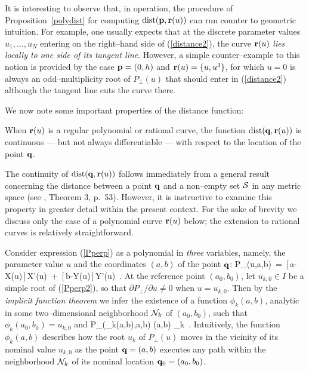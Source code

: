 \begin{exmpl}
{\rm
It is interesting to observe that, in operation, the procedure of
Proposition~\ref{polydist} for computing ${\rm dist}({\bf p},{\bf r}(u))$
can run counter to geometric intuition. For example, one usually
expects that at the discrete parameter values $u_1,\dots,u_N$
entering on the right--hand side of (\ref{distance2}), the curve
${\bf r}(u)$ {\it lies locally to one side of its tangent line}.
However, a simple counter--example to this notion is provided by
the case ${\bf p}=(0,h)$ and ${\bf r}(u)=\{u,u^3\}$, for which
$u=0$ is always an odd--multiplicity root of $P_\perp(u)$ that
should enter in (\ref{distance2}) although the tangent line cuts
the curve there.
} \QED
\end{exmpl}

We now note some important properties of the distance function:

\begin{propn}
When ${\bf r}(u)$ is a regular polynomial or rational curve, the
function ${\rm dist}({\bf q},{\bf r}(u))$ is continuous --- but not
always differentiable --- with respect to the location of the point
${\bf q}$.
\end{propn}

\prf The continuity of ${\rm dist}({\bf q},{\bf r}(u))$ follows immediately
from a general result concerning the distance between a point ${\bf q}$
and a non--empty set ${\cal S}$ in any metric space (see \cite{kelly79},
Theorem 3, p.~53). However, it is instructive to examine this property
in greater detail within the present context. For the sake of brevity
we discuss only the case of a polynomial curve ${\bf r}(u)$ below; the
extension to rational curves is relatively straightforward.

Consider expression (\ref{Pperp}) as a polynomial in {\it three\/}
variables, namely, the parameter value $u$ and the coordinates
$(a,b)$ of the point ${\bf q}$:
\be \label{Pperp2}
P_\perp(u,a,b) \,=\,
[\,a-X(u)\,]\,X'(u) \,+\, [\,b-Y(u)\,]\,Y'(u) \,.
\ee
At the reference point $(a_0,b_0)$, let $u_{k,0} \in I$ be a simple
root of (\ref{Pperp2}), so that $\partial P_\perp/\partial u\not=0$
when $u=u_{k,0}$. Then by the {\it implicit function theorem\/} \cite
[p.~362]{buck78} we infer the existence of a function $\phi_k(a,b)$,
analytic in some two--dimensional neighborhood ${\cal N}_k$ of
$(a_0,b_0)$, such that $\phi_k(a_0,b_0)=u_{k,0}$ and
\be
P_\perp(\phi_k(a,b),a,b) 
 (a,b) _k \,.
\ee
Intuitively, the function $\phi_k(a,b)$ describes how the root $u_k$
of $P_\perp(u)$ moves in the vicinity of its nominal value $u_{k,0}$
as the point ${\bf q}=(a,b)$ executes any path within the neighborhood
${\cal N}_k$ of its nominal location ${\bf q}_0=(a_0,b_0)$.

